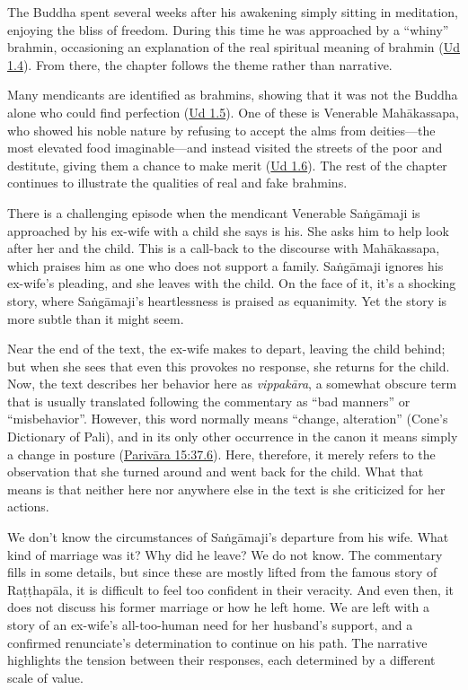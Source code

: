 \documentclass[12pt,openany]{book}%
\begin{document}
The Buddha spent several weeks after his awakening simply sitting in meditation, enjoying the bliss of freedom. During this time he was approached by a “whiny” brahmin, occasioning an explanation of the real spiritual meaning of brahmin (\href{https://suttacentral.net/ud1.4/en/sujato}{Ud 1.4}). From there, the chapter follows the theme rather than narrative.

Many mendicants are identified as brahmins, showing that it was not the Buddha alone who could find perfection (\href{https://suttacentral.net/ud1.5/en/sujato}{Ud 1.5}). One of these is Venerable \textsanskrit{Mahākassapa}, who showed his noble nature by refusing to accept the alms from deities—the most elevated food imaginable—and instead visited the streets of the poor and destitute, giving them a chance to make merit (\href{https://suttacentral.net/ud1.6/en/sujato}{Ud 1.6}). The rest of the chapter continues to illustrate the qualities of real and fake brahmins. 

There is a challenging episode when the mendicant Venerable \textsanskrit{Saṅgāmaji} is approached by his ex-wife with a child she says is his. She asks him to help look after her and the child. This is a call-back to the discourse with \textsanskrit{Mahākassapa}, which praises him as one who does not support a family. \textsanskrit{Saṅgāmaji} ignores his ex-wife’s pleading, and she leaves with the child. On the face of it, it’s a shocking story, where \textsanskrit{Saṅgāmaji}’s heartlessness is praised as equanimity. Yet the story is more subtle than it might seem. 

Near the end of the text, the ex-wife makes to depart, leaving the child behind; but when she sees that even this provokes no response, she returns for the child. Now, the text describes her behavior here as \textit{\textsanskrit{vippakāra}}, a somewhat obscure term that is usually translated following the commentary as “bad manners” or “misbehavior”. However, this word normally means “change, alteration” (Cone’s Dictionary of Pali), and in its only other occurrence in the canon it means simply a change in posture (\href{https://suttacentral.net/pli{-}tv{-}pvr15/en/brahmali\#37.6}{Parivāra 15:37.6}). Here, therefore, it merely refers to the observation that she turned around and went back for the child. What that means is that neither here nor anywhere else in the text is she criticized for her actions.

We don’t know the circumstances of \textsanskrit{Saṅgāmaji}’s departure from his wife. What kind of marriage was it? Why did he leave? We do not know. The commentary fills in some details, but since these are mostly lifted from the famous story of \textsanskrit{Raṭṭhapāla}, it is difficult to feel too confident in their veracity. And even then, it does not discuss his former marriage or how he left home. We are left with a story of an ex-wife’s all-too-human need for her husband’s support, and a confirmed renunciate’s determination to continue on his path. The narrative highlights the tension between their responses, each determined by a different scale of value. 
\end{document}

